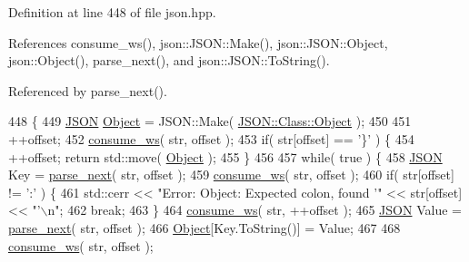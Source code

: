 Definition at line 448 of file json.\+hpp.



References consume\+\_\+ws(), json\+::\+J\+S\+O\+N\+::\+Make(), json\+::\+J\+S\+O\+N\+::\+Object, json\+::\+Object(), parse\+\_\+next(), and json\+::\+J\+S\+O\+N\+::\+To\+String().



Referenced by parse\+\_\+next().


\begin{DoxyCode}
448                                                            \{
449         \mbox{\hyperlink{class_j_s_o_n}{JSON}} \mbox{\hyperlink{namespacejson_a7bc7d25f21c18a652a42db29cfdabd06}{Object}} = JSON::Make( \mbox{\hyperlink{namespacejson_a7bc7d25f21c18a652a42db29cfdabd06}{JSON::Class::Object}} );
450 
451         ++offset;
452         \mbox{\hyperlink{namespacejson_1_1anonymous__namespace_02json_8hpp_03_a3a6e9a9e2d1cf7848055ae69f04be8b7}{consume\_ws}}( str, offset );
453         \textcolor{keywordflow}{if}( str[offset] == \textcolor{charliteral}{'\}'} ) \{
454             ++offset; \textcolor{keywordflow}{return} std::move( \mbox{\hyperlink{namespacejson_a7bc7d25f21c18a652a42db29cfdabd06}{Object}} );
455         \}
456 
457         \textcolor{keywordflow}{while}( \textcolor{keyword}{true} ) \{
458             \mbox{\hyperlink{class_j_s_o_n}{JSON}} Key = \mbox{\hyperlink{namespacejson_1_1anonymous__namespace_02json_8hpp_03_acd55b945d1583038db8633516df7cf3f}{parse\_next}}( str, offset );
459             \mbox{\hyperlink{namespacejson_1_1anonymous__namespace_02json_8hpp_03_a3a6e9a9e2d1cf7848055ae69f04be8b7}{consume\_ws}}( str, offset );
460             \textcolor{keywordflow}{if}( str[offset] != \textcolor{charliteral}{':'} ) \{
461                 std::cerr << \textcolor{stringliteral}{"Error: Object: Expected colon, found '"} << str[offset] << \textcolor{stringliteral}{"'\(\backslash\)n"};
462                 \textcolor{keywordflow}{break};
463             \}
464             \mbox{\hyperlink{namespacejson_1_1anonymous__namespace_02json_8hpp_03_a3a6e9a9e2d1cf7848055ae69f04be8b7}{consume\_ws}}( str, ++offset );
465             \mbox{\hyperlink{class_j_s_o_n}{JSON}} Value = \mbox{\hyperlink{namespacejson_1_1anonymous__namespace_02json_8hpp_03_acd55b945d1583038db8633516df7cf3f}{parse\_next}}( str, offset );
466             \mbox{\hyperlink{namespacejson_a7bc7d25f21c18a652a42db29cfdabd06}{Object}}[Key.ToString()] = Value;
467             
468             \mbox{\hyperlink{namespacejson_1_1anonymous__namespace_02json_8hpp_03_a3a6e9a9e2d1cf7848055ae69f04be8b7}{consume\_ws}}( str, offset );

\end{DoxyCode}
